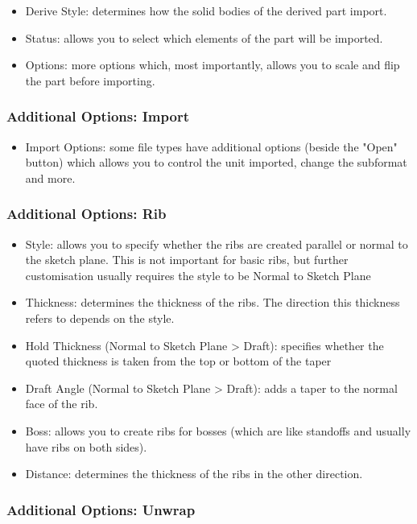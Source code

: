\begin{itemize}
\item Derive Style: determines how the solid bodies of the derived part import.
\item Status: allows you to select which elements of the part will be imported.
\item Options: more options which, most importantly, allows you to scale and flip the part before importing.
\end{itemize}

\subsubsection{Additional Options: Import}

\begin{itemize}
\item Import Options: some file types have additional options (beside the "Open" button) which allows you to control the unit imported, change the subformat and more.
\end{itemize}

\subsubsection{Additional Options: Rib}

\begin{itemize}
\item Style: allows you to specify whether the ribs are created parallel or normal to the sketch plane. This is not important for basic ribs, but further customisation usually requires the style to be Normal to Sketch Plane
\item Thickness: determines the thickness of the ribs. The direction this thickness refers to depends on the style.
\item Hold Thickness (Normal to Sketch Plane > Draft): specifies whether the quoted thickness is taken from the top or bottom of the taper
\item Draft Angle (Normal to Sketch Plane > Draft): adds a taper to the normal face of the rib.
\item Boss: allows you to create ribs for bosses (which are like standoffs and usually have ribs on both sides).
\item Distance: determines the thickness of the ribs in the other direction. 
\end{itemize}

\subsubsection{Additional Options: Unwrap}

